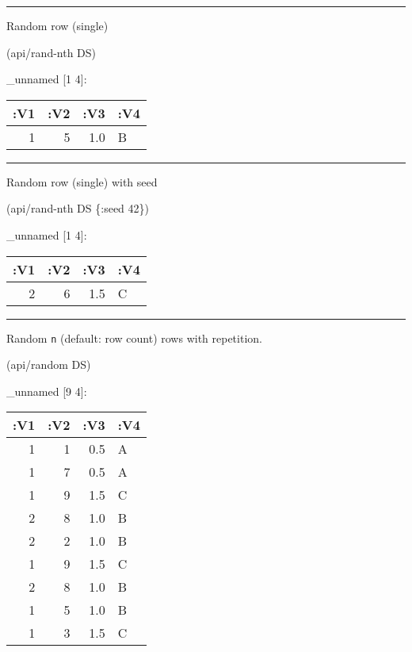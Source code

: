 \documentclass[]{article}
\newenvironment{Shaded}{\begin{snugshade}}{\end{snugshade}}
\newcommand{\DecValTok}[1]{\textcolor[rgb]{0.00,0.00,0.81}{#1}}
\newcommand{\AttributeTok}[1]{\textcolor[rgb]{0.77,0.63,0.00}{#1}}
\newcommand{\NormalTok}[1]{#1}
\begin{document}
\begin{center}\rule{0.5\linewidth}{0.5pt}\end{center}

Random row (single)

\begin{Shaded}
\begin{Highlighting}[]
\NormalTok{(api/rand-nth DS)}
\end{Highlighting}
\end{Shaded}

\_unnamed {[}1 4{]}:

\begin{longtable}[]{@{}rrrl@{}}
\toprule
:V1 & :V2 & :V3 & :V4\tabularnewline
\midrule
\endhead
1 & 5 & 1.0 & B\tabularnewline
\bottomrule
\end{longtable}

\begin{center}\rule{0.5\linewidth}{0.5pt}\end{center}

Random row (single) with seed

\begin{Shaded}
\begin{Highlighting}[]
\NormalTok{(api/rand-nth DS \{}\AttributeTok{:seed} \DecValTok{42}\NormalTok{\})}
\end{Highlighting}
\end{Shaded}

\_unnamed {[}1 4{]}:

\begin{longtable}[]{@{}rrrl@{}}
\toprule
:V1 & :V2 & :V3 & :V4\tabularnewline
\midrule
\endhead
2 & 6 & 1.5 & C\tabularnewline
\bottomrule
\end{longtable}

\begin{center}\rule{0.5\linewidth}{0.5pt}\end{center}

Random \texttt{n} (default: row count) rows with repetition.

\begin{Shaded}
\begin{Highlighting}[]
\NormalTok{(api/random DS)}
\end{Highlighting}
\end{Shaded}

\_unnamed {[}9 4{]}:

\begin{longtable}[]{@{}rrrl@{}}
\toprule
:V1 & :V2 & :V3 & :V4\tabularnewline
\midrule
\endhead
1 & 1 & 0.5 & A\tabularnewline
1 & 7 & 0.5 & A\tabularnewline
1 & 9 & 1.5 & C\tabularnewline
2 & 8 & 1.0 & B\tabularnewline
2 & 2 & 1.0 & B\tabularnewline
1 & 9 & 1.5 & C\tabularnewline
2 & 8 & 1.0 & B\tabularnewline
1 & 5 & 1.0 & B\tabularnewline
1 & 3 & 1.5 & C\tabularnewline
\bottomrule
\end{longtable}
\end{document}
